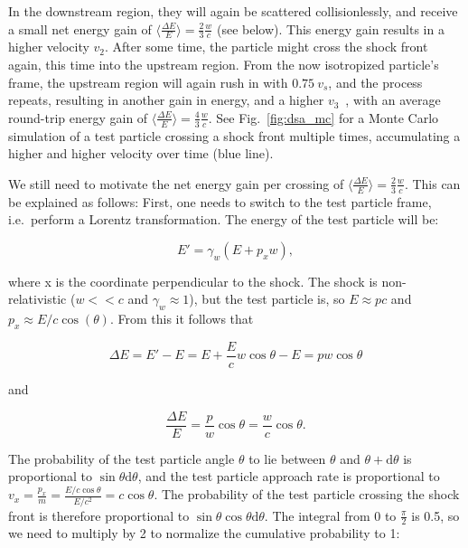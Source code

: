 In the downstream region, they will again be scattered collisionlessly, and receive a small net energy gain of $\big\langle\frac{\Delta E}{E}\big\rangle = \frac{2}{3}\frac{w}{c}$ (see below). This energy gain results in a higher velocity $v_2$. After some time, the particle might cross the shock front again, this time into the upstream region. From the now isotropized particle's frame, the upstream region will again rush in with $0.75~v_s$, and the process repeats, resulting in another gain in energy, and a higher $v_3$~, with an average round-trip energy gain of $\big\langle\frac{\Delta E}{E}\big\rangle = \frac{4}{3}\frac{w}{c}$. See Fig.~\ref{fig:dsa_mc} for a Monte Carlo simulation of a test particle crossing a shock front multiple times, accumulating a higher and higher velocity over time (blue line).

We still need to motivate the net energy gain per crossing of $\big\langle\frac{\Delta E}{E}\big\rangle = \frac{2}{3}\frac{w}{c}$. This can be explained as follows: First, one needs to switch to the test particle frame, i.e.\ perform a Lorentz transformation. The energy of the test particle will be:

\begin{equation}
  E' = \gamma_{w}(E+p_x w),
\end{equation}

where x is the coordinate perpendicular to the shock. The shock is non-relativistic ($w<<c$ and $\gamma_w\approx1$), but the test particle is, so $E\approx pc$ and $p_x \approx E/c \cos(\theta)$. From this it follows that

\begin{equation}
  \Delta E = E' - E = E+\frac{E}{c}w\cos{\theta}-E = pw\cos{\theta}
\end{equation}

and

\begin{equation}
  \frac{\Delta E}{E} = \frac{p}{w}\cos{\theta} = \frac{w}{c}\cos{\theta}.
  \label{eqn:delta_e_over_e}
\end{equation}

The probability of the test particle angle $\theta$ to lie between $\theta$ and $\theta + \text{d}\theta$ is proportional to $\sin{\theta}\text{d}\theta$, and the test particle approach rate is proportional to $v_x = \frac{p_x}{m} = \frac{E/c\cos{\theta}}{E/c^2} = c \cos{\theta}$. The probability of the test particle crossing the shock front is therefore proportional to $\sin{\theta} \cos{\theta} \text{d}\theta$. The integral from 0 to $\frac{\pi}{2}$ is 0.5, so we need to multiply by 2 to normalize the cumulative probability to 1:

